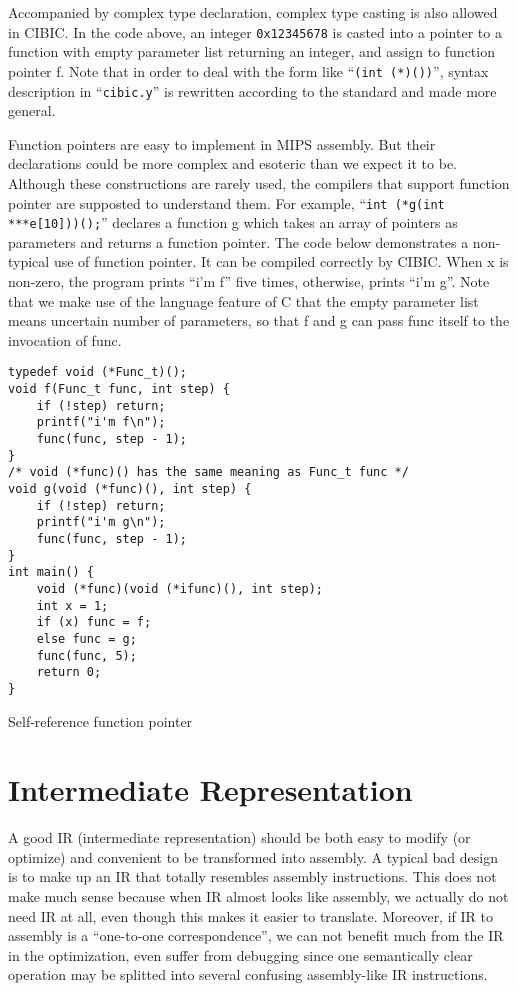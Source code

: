 \documentclass[10pt, a4paper]{article}
\begin{document}
Accompanied by complex type declaration, complex type casting is also allowed in
CIBIC. In the code above, an integer \texttt{0x12345678} is casted into a
pointer to a function with empty parameter list returning an integer, and assign
to function pointer f. Note that in order to deal with the form like
``\texttt{(int (*)())}'', syntax description in ``\texttt{cibic.y}'' is rewritten
according to the standard and made more general.

Function pointers are easy to implement in MIPS assembly. But their declarations
could be more complex and esoteric than we expect it to be. Although these
constructions are rarely used, the compilers that support function pointer are
supposted to understand them. For example, ``\texttt{int (*g(int
***e[10]))();}'' declares a function g which takes an array of pointers as
parameters and returns a function pointer. The code below demonstrates a
non-typical use of function pointer. It can be compiled correctly by CIBIC. When
x is non-zero, the program prints ``i'm f'' five times, otherwise, prints ``i'm
g''. Note that we make use of the language feature of C that the empty parameter
list means uncertain number of parameters, so that f and g can pass func itself
to the invocation of func.
\begin{listing}[H]
    \centering
    \begin{verbatim}
typedef void (*Func_t)();
void f(Func_t func, int step) {
    if (!step) return;
    printf("i'm f\n");
    func(func, step - 1);
}
/* void (*func)() has the same meaning as Func_t func */
void g(void (*func)(), int step) {
    if (!step) return;
    printf("i'm g\n");
    func(func, step - 1);
}
int main() {
    void (*func)(void (*ifunc)(), int step);
    int x = 1;
    if (x) func = f;
    else func = g;
    func(func, 5);
    return 0;
}
    \end{verbatim}
    \caption {Self-reference function pointer}
\end{listing}
\section{Intermediate Representation}
A good IR (intermediate representation) should be both easy to modify (or
optimize) and convenient to be transformed into assembly. A typical bad design
is to make up an IR that totally resembles assembly instructions. This does not
make much sense because when IR almost looks like assembly, we actually do not
need IR at all, even though this makes it easier to translate. Moreover, if IR
to assembly is a ``one-to-one correspondence'', we can not benefit much from
the IR in the optimization, even suffer from debugging since one semantically
clear operation may be splitted into several confusing assembly-like IR
instructions.
\end{document}
